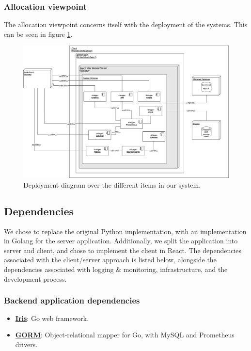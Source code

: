 \documentclass{article}
\begin{document}
\subsubsection{Allocation viewpoint}
The allocation viewpoint concerns itself with the deployment of the systems. This can be seen in figure \ref{fig:deployment-diagram}.

\begin{figure}[H]
   \centering
   \includegraphics[width=\textwidth]{minitwit-system-architecture-1-deployment.drawio.png}
   \caption{Deployment diagram over the different items in our system.}
   \label{fig:deployment-diagram}
\end{figure}

\subsection{Dependencies}

We chose to replace the original Python implementation, with an implementation in Golang for the server application. Additionally, we split the application into server and client, and chose to implement the client in React. The dependencies associated with the client/server approach is listed below, alongside the dependencies associated with logging \& monitoring, infrastructure, and the development process.

\subsubsection{Backend application dependencies}
\begin{itemize}
    \item \href{https://github.com/kataras/iris}{\textbf{Iris}}: Go web framework.
    \item \href{https://gorm.io/}{\textbf{GORM}}: Object-relational mapper for Go, with MySQL and Prometheus drivers.
\end{itemize}
\end{document}
